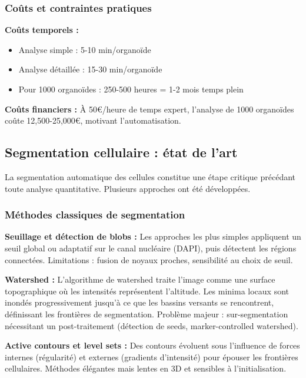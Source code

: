 \subsubsection{Coûts et contraintes pratiques}

\textbf{Coûts temporels :}
\begin{itemize}
    \item Analyse simple : 5-10 min/organoïde
    \item Analyse détaillée : 15-30 min/organoïde
    \item Pour 1000 organoïdes : 250-500 heures = 1-2 mois temps plein
\end{itemize}

\textbf{Coûts financiers :}
À 50€/heure de temps expert, l'analyse de 1000 organoïdes coûte 12,500-25,000€, motivant l'automatisation.

\subsection{Segmentation cellulaire : état de l'art}

La segmentation automatique des cellules constitue une étape critique précédant toute analyse quantitative. Plusieurs approches ont été développées.

\subsubsection{Méthodes classiques de segmentation}

\textbf{Seuillage et détection de blobs :}
Les approches les plus simples appliquent un seuil global ou adaptatif sur le canal nucléaire (DAPI), puis détectent les régions connectées. Limitations : fusion de noyaux proches, sensibilité au choix de seuil.

\textbf{Watershed :}
L'algorithme de watershed traite l'image comme une surface topographique où les intensités représentent l'altitude. Les minima locaux sont inondés progressivement jusqu'à ce que les bassins versants se rencontrent, définissant les frontières de segmentation. Problème majeur : sur-segmentation nécessitant un post-traitement (détection de seeds, marker-controlled watershed).

\textbf{Active contours et level sets :}
Des contours évoluent sous l'influence de forces internes (régularité) et externes (gradients d'intensité) pour épouser les frontières cellulaires. Méthodes élégantes mais lentes en 3D et sensibles à l'initialisation.

